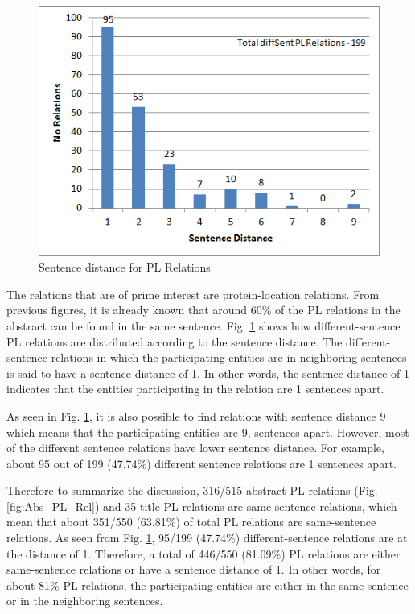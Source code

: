 \begin{figure}
\centering
\includegraphics[scale=0.9]{figures/SentenceDistance_PLRel.png}
\caption{Sentence distance for PL Relations}\label{fig:SentDistancePL}
\end{figure}

The relations that are of prime interest are protein-location relations. From previous figures, it is already known that around 60\% of the PL relations in the abstract can be found in the same sentence. Fig. \ref{fig:SentDistancePL} shows how different-sentence PL relations are distributed according to the sentence distance. The different-sentence relations in which the participating entities are in neighboring sentences is said to have a sentence distance of 1. In other words, the sentence distance of 1 indicates that the entities participating in the relation are 1 sentences apart. 

As seen in Fig. \ref{fig:SentDistancePL}, it is also possible to find relations with sentence distance 9 which means that the participating entities are 9, sentences apart. However, most of the different sentence relations have lower sentence distance. For example, about 95 out of 199 (47.74\%) different sentence relations are 1 sentences apart.

Therefore to summarize the discussion, 316/515 abstract PL relations (Fig. \ref{fig:Abs_PL_Rel}) and 35 title PL relations are same-sentence relations, which mean that about 351/550 (63.81\%) of total PL relations are same-sentence relations. As seen from  Fig. \ref{fig:SentDistancePL}, 95/199 (47.74\%) different-sentence relations are at the distance of 1. Therefore, a total of 446/550 (81.09\%) PL relations are either same-sentence relations or have a sentence distance of 1. In other words, for about 81\% PL relations, the participating entities are either in the same sentence or in the neighboring sentences.

